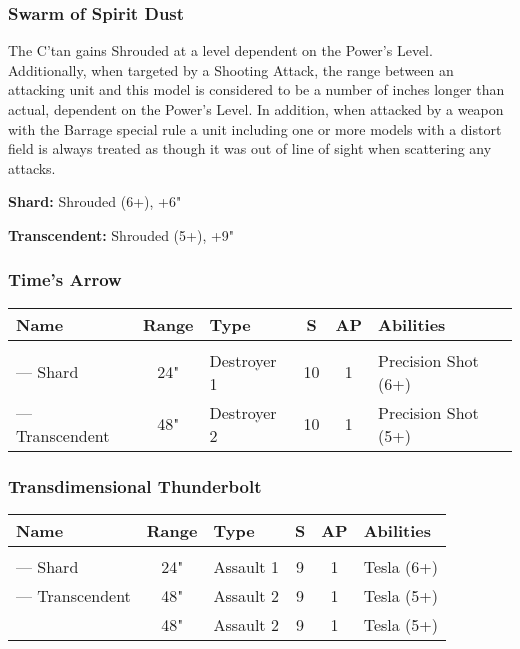 \subsubsection{Swarm of Spirit Dust} \label{Swarm of Spirit Dust}

The C'tan gains Shrouded at a level dependent on the Power's Level. Additionally, when targeted by a Shooting Attack, the range between an attacking unit and this model is considered to be a number of inches longer than actual, dependent on the Power's Level. In addition, when attacked by a weapon with the Barrage special rule a unit including one or more models with a distort field is always treated as though it was out of line of sight when scattering any attacks.

\textbf{Shard:} Shrouded (6+), +6"

\textbf{Transcendent:} Shrouded (5+), +9"

\subsubsection{Time's Arrow} \label{Time's Arrow}

\noindent
\begin{NiceTabular}{L{115 pt} c C{40pt} *{2}{c} >{\raggedright\arraybackslash}p{240pt}}
	Name & Range & Type & S & AP & Abilities \\
	\hline
	 &  &  &  &  & \\
	— Shard & 24" & Destroyer 1 & 10 & 1 & Precision Shot (6+) \\
	 — Transcendent & 48" & Destroyer 2 & 10 & 1 & Precision Shot (5+) \\
\end{NiceTabular}

\subsubsection{Transdimensional Thunderbolt} \label{Transdimensional Thunderbolt}

\noindent
\begin{NiceTabular}{L{115 pt} c C{40pt} *{2}{c} >{\raggedright\arraybackslash}p{240pt}}
	Name & Range & Type & S & AP & Abilities \\
	\hline
	 &  &  &  &  & \\
	— Shard & 24" & Assault 1 & 9 & 1 & Tesla (6+) \\
	 — Transcendent & 48" & Assault 2 & 9 & 1 & Tesla (5+) \\ & 48" & Assault 2 & 9 & 1 & Tesla (5+) \\
\end{NiceTabular}



